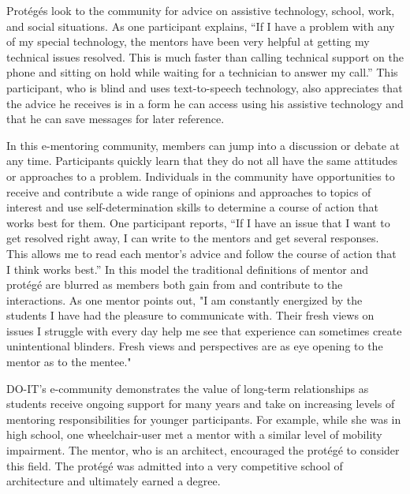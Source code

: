 \documentclass[11.5pt]{sig-alternate} %
\begin{document}
\begin{large}
Protégés look to the community for advice on assistive technology, school, work, and social situations. As one participant explains, “If I have a problem with any of my special technology, the mentors have been very helpful at getting my technical issues resolved. This is much faster than calling technical support on the phone and sitting on hold while waiting for a technician to answer my call.” This participant, who is blind and uses text-to-speech technology, also appreciates that the advice he receives is in a form he can access using his assistive technology and that he can save messages for later reference.

In this e-mentoring community, members can jump into a discussion or debate at any time. Participants quickly learn that they do not all have the same attitudes or approaches to a problem. Individuals in the community have opportunities to receive and contribute a wide range of opinions and approaches to topics of interest and use self-determination skills to determine a course of action that works best for them. One participant reports, “If I have an issue that I want to get resolved right away, I can write to the mentors and get several responses. This allows me to read each mentor's advice and follow the course of action that I think works best.” In this model the traditional definitions of mentor and protégé are blurred as members both gain from and contribute to the interactions. As one mentor points out, "I am constantly energized by the students I have had the pleasure to communicate with. Their fresh views on issues I struggle with every day help me see that experience can sometimes create unintentional blinders. Fresh views and perspectives are as eye opening to the mentor as to the mentee."

DO-IT's e-community demonstrates the value of long-term relationships as students receive ongoing support for many years and take on increasing levels of mentoring responsibilities for younger participants. For example, while she was in high school, one wheelchair-user met a mentor with a similar level of mobility impairment. The mentor, who is an architect, encouraged the protégé to consider this field. The protégé was admitted into a very competitive school of architecture and ultimately earned a degree.


\end{large}
\end{document}
